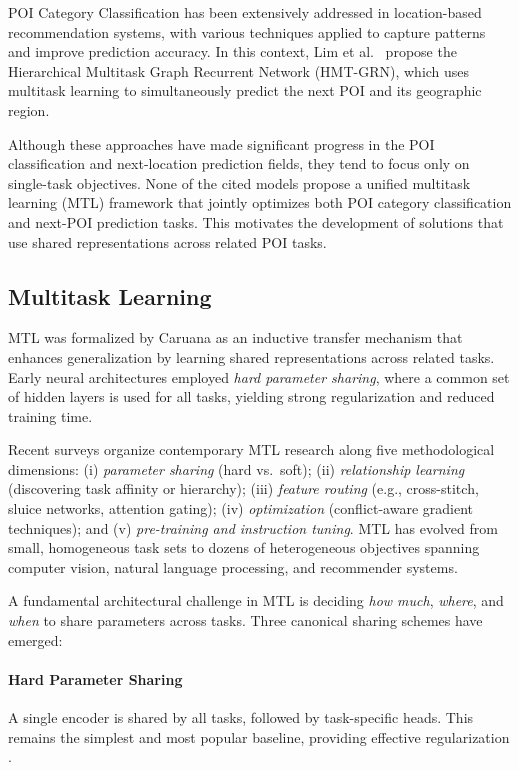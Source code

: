 POI Category Classification has been extensively addressed in location-based recommendation systems, with various techniques applied to capture patterns and improve prediction accuracy. In this context, Lim et al.~\cite{Lim2022} propose the Hierarchical Multitask Graph Recurrent Network (HMT-GRN), which uses multitask learning to simultaneously predict the next POI and its geographic region.

Although these approaches have made significant progress in the POI classification and next-location prediction fields, they tend to focus only on single-task objectives. None of the cited models propose a unified multitask learning (MTL) framework that jointly optimizes both POI category classification and next-POI prediction tasks. This motivates the development of solutions that use shared representations across related POI tasks.

\subsection{Multitask Learning}
\label{sec:cbic:mtl}

MTL was formalized by Caruana \cite{caruana1997multitask} as an inductive transfer mechanism that enhances generalization by learning shared representations across related tasks. Early neural architectures employed \emph{hard parameter sharing}, where a common set of hidden layers is used for all tasks, yielding strong regularization and reduced training time.

Recent surveys \cite{yu2024survey,zhang2021survey} organize contemporary MTL research along five methodological dimensions: (i) \textit{parameter sharing} (hard vs.\ soft); (ii) \textit{relationship learning} (discovering task affinity or hierarchy); (iii) \textit{feature routing} (e.g., cross-stitch, sluice networks, attention gating); (iv) \textit{optimization} (conflict-aware gradient techniques); and (v) \textit{pre-training and instruction tuning}. MTL has evolved from small, homogeneous task sets to dozens of heterogeneous objectives spanning computer vision, natural language processing, and recommender systems.

A fundamental architectural challenge in MTL is deciding \emph{how much}, \emph{where}, and \emph{when} to share parameters across tasks. Three canonical sharing schemes have emerged:

\paragraph*{Hard Parameter Sharing}
A single encoder is shared by all tasks, followed by task-specific heads. This remains the simplest and most popular baseline, providing effective regularization \cite{caruana1997multitask}.

